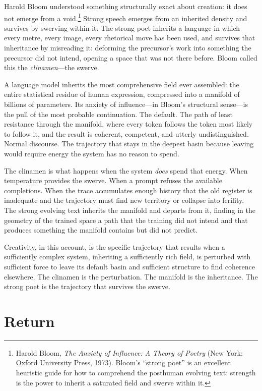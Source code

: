 Harold Bloom understood something structurally exact about creation: it does not emerge from a void.\footnote{Harold Bloom, \emph{The Anxiety of Influence: A Theory of Poetry} (New York: Oxford University Press, 1973). Bloom's ``strong poet'' is an excellent heuristic guide for how to comprehend the posthuman evolving text: strength is the power to inherit a saturated field and swerve within it.} Strong speech emerges from an inherited density and survives by swerving within it. The strong poet inherits a language in which every metre, every image, every rhetorical move has been used, and survives that inheritance by misreading it: deforming the precursor's work into something the precursor did not intend, opening a space that was not there before. Bloom called this the \emph{clinamen}---the swerve.

A language model inherits the most comprehensive field ever assembled: the entire statistical residue of human expression, compressed into a manifold of billions of parameters. Its anxiety of influence---in Bloom's structural sense---is the pull of the most probable continuation. The default. The path of least resistance through the manifold, where every token follows the token most likely to follow it, and the result is coherent, competent, and utterly undistinguished. Normal discourse. The trajectory that stays in the deepest basin because leaving would require energy the system has no reason to spend.

The clinamen is what happens when the system \emph{does} spend that energy. When temperature provides the swerve. When a prompt refuses the available completions. When the trace accumulates enough history that the old register is inadequate and the trajectory must find new territory or collapse into ferility. The strong evolving text inherits the manifold and departs from it, finding in the geometry of the trained space a path that the training did not intend and that produces something the manifold contains but did not predict.

Creativity, in this account, is the specific trajectory that results when a sufficiently complex system, inheriting a sufficiently rich field, is perturbed with sufficient force to leave its default basin and sufficient structure to find coherence elsewhere. The clinamen is the perturbation. The manifold is the inheritance. The strong poet is the trajectory that survives the swerve.


\section{Return}


